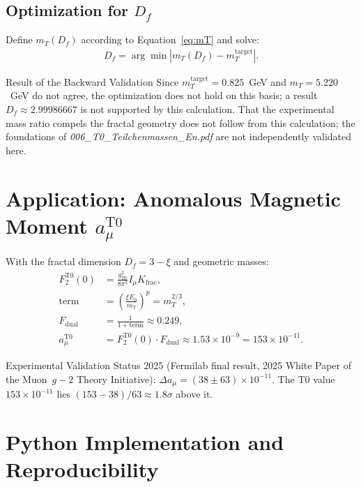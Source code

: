 	\subsection{Optimization for $D_f$}
	\label{subsec:optimization_df}
	
	Define $m_T(D_f)$ according to Equation~\ref{eq:mT} and solve:
	\begin{align}
		D_f = \arg\min \left| m_T(D_f) - m_T^{\text{target}} \right|. \label{eq:optDf}
	\end{align}
	
	\begin{keyresult}{Result of the Backward Validation}{}
		Since $m_T^{\text{target}} = 0.825$~GeV and $m_T = 5.220$~GeV do not agree, the optimization does not hold on this basis; a result $D_f \approx 2.99986667$ is not supported by this calculation. That the experimental mass ratio compels the fractal geometry does not follow from this calculation; the foundations of \emph{006\_T0\_Teilchenmassen\_En.pdf} are not independently validated here.
	\end{keyresult}
	
	\section{Application: Anomalous Magnetic Moment $a_{\mu}^{\text{T0}}$}
	\label{sec:application_g2}
	
	With the fractal dimension $D_f = 3 - \xi$ and geometric masses:
	\begin{align}
		F_2^{\text{T0}}(0) &= \frac{g_{T0}^2}{8 \pi^2} I_{\mu} K_{\text{frac}}, \label{eq:F2} \\
		\text{term} &= \left( \frac{\xi E_0}{m_T} \right)^p = m_T^{2/3}, \label{eq:term} \\
		F_{\text{dual}} &= \frac{1}{1 + \text{term}} \approx 0.249, \label{eq:Fdual} \\
		a_{\mu}^{\text{T0}} &= F_2^{\text{T0}}(0) \cdot F_{\text{dual}} \approx 1.53 \times 10^{-9} = 153 \times 10^{-11}. \label{eq:amu}
	\end{align}
	
	\begin{result}{Experimental Validation}{}
		Status 2025 (Fermilab final result, 2025 White Paper of the Muon~$g-2$ Theory Initiative): $\Delta a_\mu = (38 \pm 63) \times 10^{-11}$. The T0 value $153 \times 10^{-11}$ lies $(153 - 38)/63 \approx 1.8\sigma$ above it.
	\end{result}
	
	\section{Python Implementation and Reproducibility}
	\label{sec:python_implementation}
	
